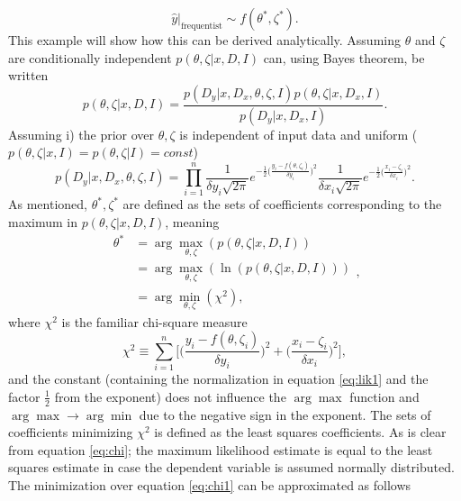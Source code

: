 \begin{example}
	\begin{equation}
		\hat{y}|_{\text{frequentist}}\sim f(\theta^*,\zeta^*).
	\end{equation}
	This example will show how this can be derived analytically. Assuming $\theta$ and $\zeta$ are conditionally independent $p(\theta,\zeta|x,D,I)$ can, using Bayes theorem, be written
	\begin{equation}
		p(\theta,\zeta|x,D,I)=\frac{p(D_y|x,D_x,\theta,\zeta,I)p(\theta,\zeta|x,D_x,I)}{p(D_y|x,D_x,I)}.
	\end{equation}
	Assuming i) the prior over $\theta,\zeta$ is independent of input data and uniform ($p(\theta,\zeta|x,I)=p(\theta,\zeta|I)=const$)
	\begin{equation}
		p(D_y|x,D_x,\theta,\zeta,I) = \prod_{i=1}^n\frac{1}{\delta y_i\sqrt{2\pi}}e^{-\frac{1}{2}\big(\frac{y_i-f(\theta,\zeta_i)}{\delta y_i}\big)^2}\frac{1}{\delta x_i\sqrt{2\pi}}e^{-\frac{1}{2}\big(\frac{x_i-\zeta_i}{\delta x_i}\big)^2}.
		\label{eq:lik1}
	\end{equation}
	As mentioned, $\theta^*,\zeta^*$ are defined as the sets of coefficients corresponding to the maximum in $p(\theta,\zeta|x,D,I)$, meaning
	\begin{equation}
		\begin{split}
			\theta^* &=\arg\max_{\theta,\zeta}(p(\theta,\zeta|x,D,I))\\
			&=\arg\max_{\theta,\zeta}(\ln(p(\theta,\zeta|x,D,I)))\\
			&=\arg\min_{\theta,\zeta}(\chi^2),
		\end{split},
		\label{eq:chi}
	\end{equation}
	where $\chi^2$ is the familiar chi-square measure
	\begin{equation}
		\chi^2\equiv \sum_{i=1}^n\bigg[\bigg(\frac{y_i-f(\theta,\zeta_i)}{\delta y_i}\bigg)^2+\bigg(\frac{x_i-\zeta_i}{\delta x_i}\bigg)^2\bigg],
		\label{eq:chi1}
	\end{equation}
	and the constant (containing the normalization in equation \eqref{eq:lik1} and the factor $\frac{1}{2}$ from the exponent) does not influence the $\arg\max$ function and $\arg\max\rightarrow \arg\min$ due to the negative sign in the exponent. The sets of coefficients minimizing $\chi^2$ is defined as the least squares coefficients. As is clear from equation \eqref{eq:chi}; the maximum likelihood estimate is equal to the least squares estimate in case the dependent variable is assumed normally distributed. \newline
	The minimization over equation \eqref{eq:chi1} can be approximated as follows

\end{example}
